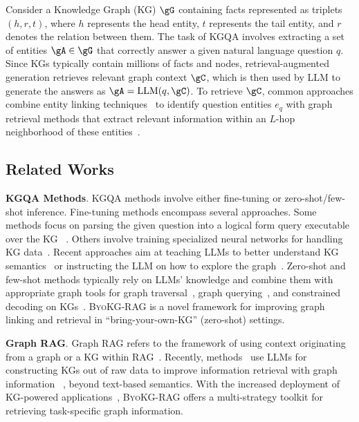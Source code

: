 \documentclass[11pt]{article}
\newcommand{\byokg}{\textsc{ByoKG-RAG}\xspace}
\begin{document}
Consider a Knowledge Graph (KG) $\gG$ containing facts represented as triplets $(h,r,t)$, where $h$ represents the head entity, $t$ represents the tail entity, and $r$ denotes the relation between them. The task of KGQA involves extracting a set of entities $\gA \in \gG$ that correctly answer a given natural language question $q$. Since KGs typically contain millions of facts and nodes, retrieval-augmented generation  retrieves relevant graph context $\gC$, which is then used by LLM to generate the answers as $\gA = \text{LLM}(q, \gC)$. To retrieve $\gC$, common approaches combine entity linking techniques~\citep{yih2015semantic} to identify question entities ${e_q}$ with graph retrieval methods that extract relevant information within an $L$-hop neighborhood of these entities~\citep{sun-etal-2018-open}.





\subsection{Related Works}
\textbf{KGQA Methods}. 
KGQA methods involve either fine-tuning or zero-shot/few-shot inference. Fine-tuning methods encompass several approaches. Some methods focus on parsing the given question into a logical form query executable over the KG ~\citep{sun2020sparqa,lan-jiang-2020-query,ye-etal-2022-rng,gu-etal-2023-dont,agarwal2023bring}. Others involve training specialized neural networks for handling KG data~\citep{sun-etal-2018-open,he2021improving, mavromatis2022rearev,jiang2023unikgqa}. Recent approaches aim at teaching LLMs to better understand KG semantics~\citep{luo2024rog,ao2025lightprof} or instructing the LLM on how to explore the graph~\citep{jiang2024kg,luo2025kbqao1,zhang2025learning}. 
Zero-shot and few-shot methods typically  rely on LLMs' knowledge and combine them with appropriate graph tools for graph traversal~\citep{jiang2023structgpt, kim2023kggpt, sun2024tog,dong-2025-effiqa,sui2024fidelis,jo2025r2}, graph querying~\citep{li2023binder,wang2023knowledge}, and constrained decoding on KGs~\citep{luo2024graph,li2024decoding}. 
\byokg is a novel framework for improving graph linking and retrieval in ``bring-your-own-KG'' (zero-shot) settings.







\textbf{Graph RAG}. Graph RAG refers to the framework of using context originating from a graph or a KG within RAG~\citep{edge2024local,he2024gretriever,mavromatis2024gnn}. Recently, methods~\citep{gutierrez2024hipporag,guo2024lightrag,luo2025gfm,chen2025pathrag} use LLMs for constructing KGs out of raw data to improve information retrieval  with graph information ~\citep{lee2024hybgrag,sarmah2024hybridrag}, beyond text-based semantics. With the increased deployment of KG-powered applications~\citep{peng2024graph}, \byokg offers a multi-strategy toolkit for retrieving task-specific graph information.
\end{document}
